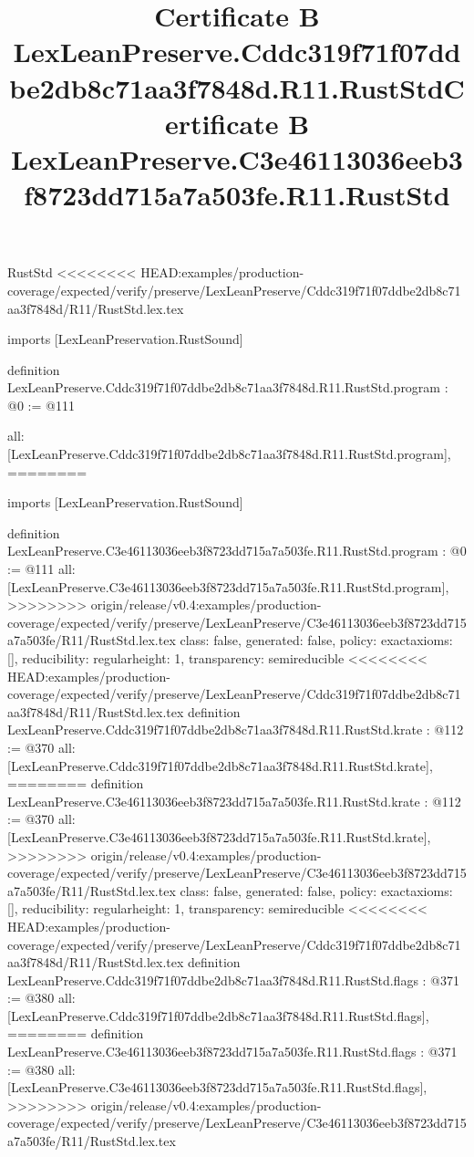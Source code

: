 \begin{lexlean}{RustStd}
<<<<<<<< HEAD:examples/production-coverage/expected/verify/preserve/LexLeanPreserve/Cddc319f71f07ddbe2db8c71aa3f7848d/R11/RustStd.lex.tex
\title{Certificate B LexLeanPreserve.Cddc319f71f07ddbe2db8c71aa3f7848d.R11.RustStd}
\begin{coremodule}
imports [LexLeanPreservation.RustSound]

definition LexLeanPreserve.Cddc319f71f07ddbe2db8c71aa3f7848d.R11.RustStd.program : @0 := @111 {
  all: [LexLeanPreserve.Cddc319f71f07ddbe2db8c71aa3f7848d.R11.RustStd.program],
========
\title{Certificate B LexLeanPreserve.C3e46113036eeb3f8723dd715a7a503fe.R11.RustStd}
\begin{coremodule}
imports [LexLeanPreservation.RustSound]

definition LexLeanPreserve.C3e46113036eeb3f8723dd715a7a503fe.R11.RustStd.program : @0 := @111 {
  all: [LexLeanPreserve.C3e46113036eeb3f8723dd715a7a503fe.R11.RustStd.program],
>>>>>>>> origin/release/v0.4:examples/production-coverage/expected/verify/preserve/LexLeanPreserve/C3e46113036eeb3f8723dd715a7a503fe/R11/RustStd.lex.tex
  class: false,
  generated: false,
  policy: exact{axioms: []},
  reducibility: regular{height: 1},
  transparency: semireducible
}
<<<<<<<< HEAD:examples/production-coverage/expected/verify/preserve/LexLeanPreserve/Cddc319f71f07ddbe2db8c71aa3f7848d/R11/RustStd.lex.tex
definition LexLeanPreserve.Cddc319f71f07ddbe2db8c71aa3f7848d.R11.RustStd.krate : @112 := @370 {
  all: [LexLeanPreserve.Cddc319f71f07ddbe2db8c71aa3f7848d.R11.RustStd.krate],
========
definition LexLeanPreserve.C3e46113036eeb3f8723dd715a7a503fe.R11.RustStd.krate : @112 := @370 {
  all: [LexLeanPreserve.C3e46113036eeb3f8723dd715a7a503fe.R11.RustStd.krate],
>>>>>>>> origin/release/v0.4:examples/production-coverage/expected/verify/preserve/LexLeanPreserve/C3e46113036eeb3f8723dd715a7a503fe/R11/RustStd.lex.tex
  class: false,
  generated: false,
  policy: exact{axioms: []},
  reducibility: regular{height: 1},
  transparency: semireducible
}
<<<<<<<< HEAD:examples/production-coverage/expected/verify/preserve/LexLeanPreserve/Cddc319f71f07ddbe2db8c71aa3f7848d/R11/RustStd.lex.tex
definition LexLeanPreserve.Cddc319f71f07ddbe2db8c71aa3f7848d.R11.RustStd.flags : @371 := @380 {
  all: [LexLeanPreserve.Cddc319f71f07ddbe2db8c71aa3f7848d.R11.RustStd.flags],
========
definition LexLeanPreserve.C3e46113036eeb3f8723dd715a7a503fe.R11.RustStd.flags : @371 := @380 {
  all: [LexLeanPreserve.C3e46113036eeb3f8723dd715a7a503fe.R11.RustStd.flags],
>>>>>>>> origin/release/v0.4:examples/production-coverage/expected/verify/preserve/LexLeanPreserve/C3e46113036eeb3f8723dd715a7a503fe/R11/RustStd.lex.tex
}}}
\end{coremodule}}
\end{coremodule}
\end{lexlean}
